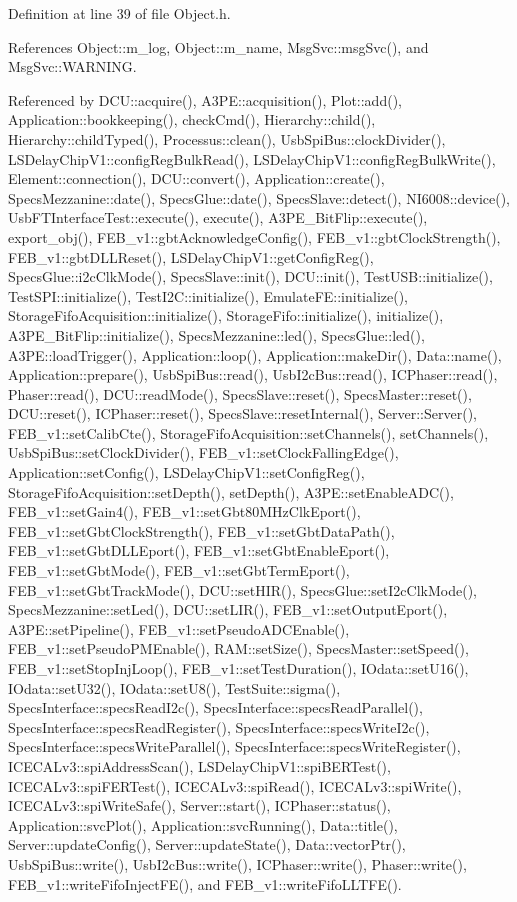 Definition at line 39 of file Object.h.

References Object::m\_\-log, Object::m\_\-name, MsgSvc::msgSvc(), and MsgSvc::WARNING.

Referenced by DCU::acquire(), A3PE::acquisition(), Plot::add(), Application::bookkeeping(), checkCmd(), Hierarchy::child(), Hierarchy::childTyped(), Processus::clean(), UsbSpiBus::clockDivider(), LSDelayChipV1::configRegBulkRead(), LSDelayChipV1::configRegBulkWrite(), Element::connection(), DCU::convert(), Application::create(), SpecsMezzanine::date(), SpecsGlue::date(), SpecsSlave::detect(), NI6008::device(), UsbFTInterfaceTest::execute(), execute(), A3PE\_\-BitFlip::execute(), export\_\-obj(), FEB\_\-v1::gbtAcknowledgeConfig(), FEB\_\-v1::gbtClockStrength(), FEB\_\-v1::gbtDLLReset(), LSDelayChipV1::getConfigReg(), SpecsGlue::i2cClkMode(), SpecsSlave::init(), DCU::init(), TestUSB::initialize(), TestSPI::initialize(), TestI2C::initialize(), EmulateFE::initialize(), StorageFifoAcquisition::initialize(), StorageFifo::initialize(), initialize(), A3PE\_\-BitFlip::initialize(), SpecsMezzanine::led(), SpecsGlue::led(), A3PE::loadTrigger(), Application::loop(), Application::makeDir(), Data::name(), Application::prepare(), UsbSpiBus::read(), UsbI2cBus::read(), ICPhaser::read(), Phaser::read(), DCU::readMode(), SpecsSlave::reset(), SpecsMaster::reset(), DCU::reset(), ICPhaser::reset(), SpecsSlave::resetInternal(), Server::Server(), FEB\_\-v1::setCalibCte(), StorageFifoAcquisition::setChannels(), setChannels(), UsbSpiBus::setClockDivider(), FEB\_\-v1::setClockFallingEdge(), Application::setConfig(), LSDelayChipV1::setConfigReg(), StorageFifoAcquisition::setDepth(), setDepth(), A3PE::setEnableADC(), FEB\_\-v1::setGain4(), FEB\_\-v1::setGbt80MHzClkEport(), FEB\_\-v1::setGbtClockStrength(), FEB\_\-v1::setGbtDataPath(), FEB\_\-v1::setGbtDLLEport(), FEB\_\-v1::setGbtEnableEport(), FEB\_\-v1::setGbtMode(), FEB\_\-v1::setGbtTermEport(), FEB\_\-v1::setGbtTrackMode(), DCU::setHIR(), SpecsGlue::setI2cClkMode(), SpecsMezzanine::setLed(), DCU::setLIR(), FEB\_\-v1::setOutputEport(), A3PE::setPipeline(), FEB\_\-v1::setPseudoADCEnable(), FEB\_\-v1::setPseudoPMEnable(), RAM::setSize(), SpecsMaster::setSpeed(), FEB\_\-v1::setStopInjLoop(), FEB\_\-v1::setTestDuration(), IOdata::setU16(), IOdata::setU32(), IOdata::setU8(), TestSuite::sigma(), SpecsInterface::specsReadI2c(), SpecsInterface::specsReadParallel(), SpecsInterface::specsReadRegister(), SpecsInterface::specsWriteI2c(), SpecsInterface::specsWriteParallel(), SpecsInterface::specsWriteRegister(), ICECALv3::spiAddressScan(), LSDelayChipV1::spiBERTest(), ICECALv3::spiFERTest(), ICECALv3::spiRead(), ICECALv3::spiWrite(), ICECALv3::spiWriteSafe(), Server::start(), ICPhaser::status(), Application::svcPlot(), Application::svcRunning(), Data::title(), Server::updateConfig(), Server::updateState(), Data::vectorPtr(), UsbSpiBus::write(), UsbI2cBus::write(), ICPhaser::write(), Phaser::write(), FEB\_\-v1::writeFifoInjectFE(), and FEB\_\-v1::writeFifoLLTFE().


